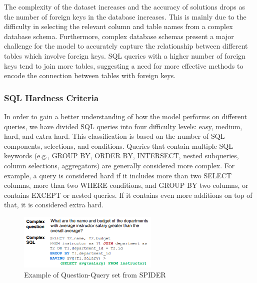 The complexity of the dataset increases and the accuracy of solutions drops as the number of foreign keys in the database increases. This is mainly due to the difficulty in selecting the relevant column and table names from a complex database schema. Furthermore, complex database schemas present a major challenge for the model to accurately capture the relationship between different tables which involve foreign keys. SQL queries with a higher number of foreign keys tend to join more tables, suggesting a need for more effective methods to encode the connection between tables with foreign keys.

\subsubsection*{SQL Hardness Criteria}

In order to gain a better understanding of how the model performs on different queries, we have divided SQL queries into four difficulty levels: easy, medium, hard, and extra hard. This classification is based on the number of SQL components, selections, and conditions. Queries that contain multiple SQL keywords (e.g., GROUP BY, ORDER BY, INTERSECT, nested subqueries, column selections, aggregators) are generally considered more complex. For example, a query is considered hard if it includes more than two SELECT columns, more than two WHERE conditions, and GROUP BY two columns, or contains EXCEPT or nested queries. If it contains even more additions on top of that, it is considered extra hard.

\begin{figure}[htb]
    \centering
    \includegraphics[width=0.6\textwidth]{pics/db/Spider2.png}
    \caption{Example of Question-Query set from SPIDER\cite{yu_spider_2019}}
    \label{fig:Spider2}
\end{figure}




